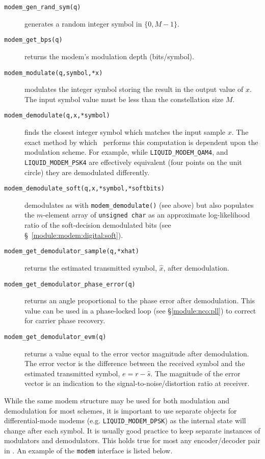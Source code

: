 \begin{description}
\item[{\tt modem\_gen\_rand\_sym(q)}]
    generates a random integer symbol in $\{0,M-1\}$.
\item[{\tt modem\_get\_bps(q)}]
    returns the modem's modulation depth (bits/symbol).
\item[{\tt modem\_modulate(q,symbol,*x)}]
    modulates the integer symbol storing the result in the output value
    of $x$.
    The input symbol value must be less than the constellation size $M$.
\item[{\tt modem\_demodulate(q,x,*symbol)}]
    finds the closest integer symbol which matches the input sample $x$.
    The exact method by which \liquid\ performs this computation is
    dependent upon the modulation scheme.
    For example, while
    {\tt LIQUID\_MODEM\_QAM4}, and
    {\tt LIQUID\_MODEM\_PSK4}
    are effectively equivalent (four points on the unit circle)
    they are demodulated differently.
\item[{\tt modem\_demodulate\_soft(q,x,*symbol,*softbits)}]
    demodulates as with {\tt modem\_demodulate()} (see above)
    but also populates the
    $m$-element array of {\tt unsigned char} as an approximate
    log-likelihood ratio of the soft-decision
    demodulated bits (see \S~\ref{module:modem:digital:soft}).
\item[{\tt modem\_get\_demodulator\_sample(q,*xhat)}]
    returns the estimated transmitted symbol, $\hat{x}$, after
    demodulation.
\item[{\tt modem\_get\_demodulator\_phase\_error(q)}]
    returns an angle proportional to the phase error after demodulation.
    This value can be used in a phase-locked loop
    (see \S\ref{module:nco:pll})
    to correct for carrier phase recovery.
\item[{\tt modem\_get\_demodulator\_evm(q)}]
    returns a value equal to the error vector magnitude after demodulation.
    The error vector is the difference between the received symbol and the
    estimated transmitted symbol, $e = r - \hat{s}$.
    The magnitude of the error vector is an indication to the
    signal-to-noise/distortion ratio at receiver.
\end{description}

While the same modem structure may be used for both modulation and
demodulation for most schemes, it is important to use separate objects
for differential-mode modems (e.g. {\tt LIQUID\_MODEM\_DPSK}) as the internal state
will change after each symbol.
It is usually good practice to keep separate instances of modulators and
demodulators.
This holds true for most any encoder/decoder pair in \liquid.
%
An example of the {\tt modem} interface is listed below.
%

%

